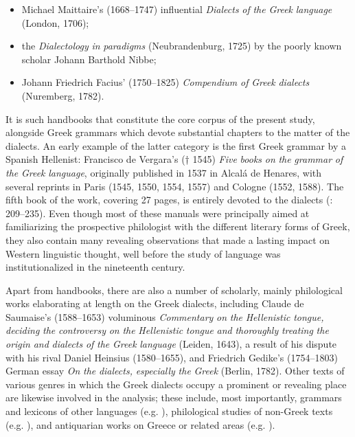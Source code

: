 \documentclass[output=paper]{langsci/langscibook}
\begin{document}
\begin{itemize}
\begin{styleListParagraph}
\end{styleListParagraph}
\item \begin{styleListParagraph}
Michael Maittaire’s (1668–1747) influential \textit{Dialects} \textit{of} \textit{the} \textit{Greek} \textit{language} (London, 1706);
\end{styleListParagraph}
\item \begin{styleListParagraph}
the \textit{Dialectology} \textit{in} \textit{paradigms} (Neubrandenburg, 1725) by the poorly known scholar Johann Barthold Nibbe;
\end{styleListParagraph}
\item \begin{styleListParagraph}
Johann Friedrich Facius’ (1750–1825) \textit{Compendium} \textit{of} \textit{Greek} \textit{dialects} (Nuremberg, 1782).
\end{styleListParagraph}
\end{itemize}

It is such handbooks that constitute the core corpus of the present study, alongside Greek grammars which devote substantial chapters to the matter of the dialects. An early example of the latter category is the first Greek grammar by a Spanish Hellenist: Francisco de Vergara’s († 1545) \textit{Five} \textit{books} \textit{on} \textit{the} \textit{grammar} \textit{of} \textit{the} \textit{Greek} \textit{language}, originally published in 1537 in Alcalá de Henares, with several reprints in Paris (1545, 1550, 1554, 1557) and Cologne (1552, 1588). The fifth book of the work, covering 27 pages, is entirely devoted to the dialects (\citealt{Vergara1537}: 209–235). Even though most of these manuals were principally aimed at familiarizing the prospective philologist with the different literary forms of Greek, they also contain many revealing observations that made a lasting impact on Western linguistic thought, well before the study of language was institutionalized in the nineteenth century.

Apart from handbooks, there are also a number of scholarly, mainly philological works elaborating at length on the Greek dialects, including Claude de Saumaise’s (1588–1653) voluminous \textit{Commentary} \textit{on} \textit{the} \textit{Hellenistic} \textit{tongue,} \textit{deciding} \textit{the} \textit{controversy} \textit{on} \textit{the} \textit{Hellenistic} \textit{tongue} \textit{and} \textit{thoroughly} \textit{treating} \textit{the} \textit{origin} \textit{and} \textit{dialects} \textit{of} \textit{the} \textit{Greek} \textit{language} (Leiden, 1643), a result of his dispute with his rival Daniel Heinsius (1580–1655), and Friedrich Gedike’s (1754–1803) German essay \textit{On} \textit{the} \textit{dialects,} \textit{especially} \textit{the} \textit{Greek} (Berlin, 1782). Other texts of various genres in which the Greek dialects occupy a prominent or revealing place are likewise involved in the analysis; these include, most importantly, grammars and lexicons of other languages (e.g. \citealt{Gill1619}), philological studies of non-Greek texts (e.g. \citealt{Schultens1748}), and antiquarian works on Greece or related areas (e.g. \citealt{Castelli1769}).
\end{document}

